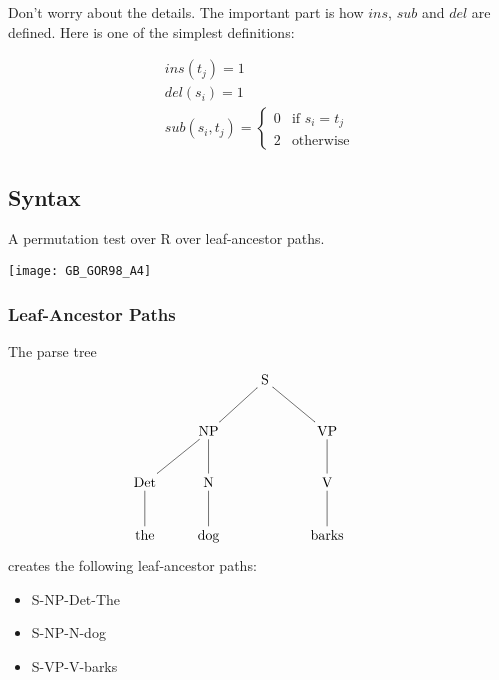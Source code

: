 \documentclass{beamer}
\begin{document}
\begin{frame}
  Don't worry about the details. The important part is how $ins$,
  $sub$ and $del$ are defined. Here is one of the simplest
  definitions:
\begin{definition}
\begin{equation}
\begin{array}{l}
   ins(t_j) = 1 \\
   del(s_i) = 1 \\
   sub(s_i,t_j) = \left\{
     \begin{array}{ll}
       0 & \textrm{if $s_i=t_j$} \\
       2 & \textrm{otherwise}
     \end{array} \right.

   \end{array}
\end{equation}
\end{definition}
\end{frame}
\subsection{Syntax}
\begin{frame}
  A permutation test over R over leaf-ancestor paths.
\end{frame}
\begin{frame}
  \texttt{[image: GB\_GOR98\_A4]}
\end{frame}
\begin{frame}
  \frametitle{Leaf-Ancestor Paths}
The parse tree
\[\xymatrix{
  &&\textrm{S} \ar@{-}[dl] \ar@{-}[dr] &&\\
  &\textrm{NP} \ar@{-}[d] \ar@{-}[dl] &&\textrm{VP} \ar@{-}[d]\\
  \textrm{Det} \ar@{-}[d] & \textrm{N} \ar@{-}[d] && \textrm{V} \ar@{-}[d] \\
\textrm{the}& \textrm{dog} && \textrm{barks}\\}
\]
creates the following leaf-ancestor paths:

\begin{itemize}
\item S-NP-Det-The
\item S-NP-N-dog
\item S-VP-V-barks
\end{itemize}
\end{frame}
\end{document}
